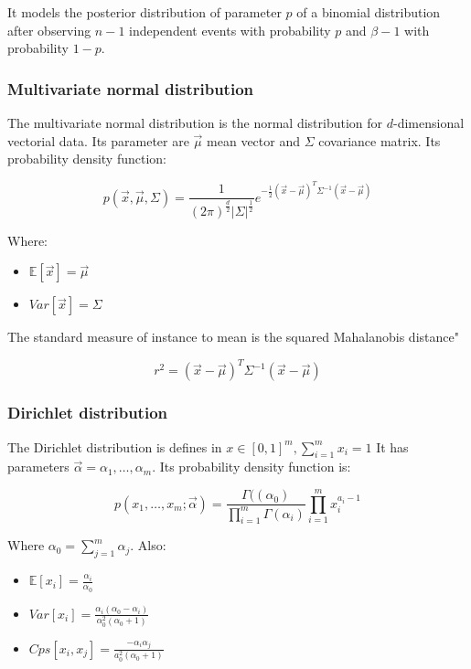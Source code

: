 		It models the posterior distribution of parameter $p$ of a binomial distribution after observing $n-1$ independent events with probability $p$ and $\beta-1$ with probability $1-p$.

		\subsubsection{Multivariate normal distribution}
		The multivariate normal distribution is the normal distribution for $d$-dimensional vectorial data.
		Its parameter are $\vec{\mu}$ mean vector and $\Sigma$ covariance matrix.
		Its probability density function:

		$$p(\vec{x}, \vec{\mu}, \Sigma) = \frac{1}{(2\pi)^{\frac{d}{2}}|\Sigma|^{\frac{1}{2}}}e^{-\frac{1}{2}(\vec{x}-\vec{\mu})^T\Sigma^{-1}(\vec{x}-\vec{\mu})}$$

		Where:

		\begin{multicols}{2}
			\begin{itemize}
				\item $\mathbb{E}[\vec{x}] = \vec{\mu}$
				\item $Var[\vec{x}] = \Sigma$
			\end{itemize}
		\end{multicols}

		The standard measure of instance to mean is the squared Mahalanobis distance"

		$$r^2 = (\vec{x}-\vec{\mu})^T\Sigma^{-1}(\vec{x}-\vec{\mu})$$

		\subsubsection{Dirichlet distribution}
		The Dirichlet distribution is defines in $x\in [0,1]^m, \sum\limits_{i=1}^m x_i = 1$
		It has parameters $\vec{\alpha} = \alpha_1, \dots, \alpha_m$.
		Its probability density function is:

		$$p(x_1, \dots, x_m; \vec{\alpha}) = \frac{\Gamma((\alpha_0)}{\prod\limits_{i=1}^m\Gamma(\alpha_i)}\prod\limits_{i=1}^mx_i^{a_i-1}$$

		Where $\alpha_0 = \sum\limits_{j=1}^m \alpha_j$.
		Also:
		
		\begin{multicols}{3}
			\begin{itemize}
				\item $\mathbb{E}[x_i] = \frac{\alpha_i}{\alpha_0}$
				\item $Var[x_i] = \frac{\alpha_i(\alpha_0-\alpha_i)}{\alpha_0^2(\alpha_0+1)}$
				\item $Cps[x_i, x_j] = \frac{-\alpha_i\alpha_j}{a_0^2(\alpha_0+1)}$
			\end{itemize}
		\end{multicols}

